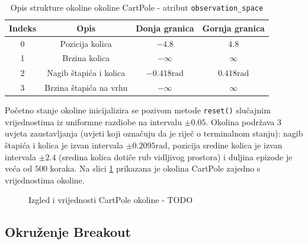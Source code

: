 \begin{table}[ht]
    \centering
    \caption{Opis strukture okoline okoline CartPole - atribut \texttt{observation_space}}
    \begin{tabular}{c c c c}
        \toprule
        Indeks & Opis & Donja granica & Gornja granica \\
        \midrule
        0 & Pozicija kolica & $-4.8$ & $4.8$ \\
        1 & Brzina kolica & $-\infty$ & $\infty$ \\ 
        2 & Nagib štapića i kolica & $-0.418 \text{rad}$ & $0.418 \text{rad}$ \\
        3 & Brzina štapića na vrhu & $-\infty$ & $\infty$ \\
        \bottomrule
    \end{tabular}
    \label{table:cart-pole-observation}
\end{table}

Početno stanje okoline inicijalizira se pozivom metode \texttt{reset()} slučajnim vrijednostima iz uniformne razdiobe na intervalu $\pm 0.05$. Okolina podržava 3 uvjeta zaustavljanja (uvjeti koji označuju da je riječ o terminalnom stanju): nagib štapića i kolica je izvan intervala $\pm 0.2095 \text{rad}$, pozicija sredine kolica je izvan intervala $\pm 2.4$ (sredina kolica dotiče rub vidljivog prostora) i duljina epizode je veća od $500$ koraka. Na slici \ref{fig:cart-pole} prikazana je okolina CartPole zajedno s vrijednostima okoline. %

\begin{figure}[H]
    \centering
    \caption{Izgled i vrijednosti CartPole okoline - TODO}
    \label{fig:cart-pole}
\end{figure}

\subsection{Okruženje Breakout}

